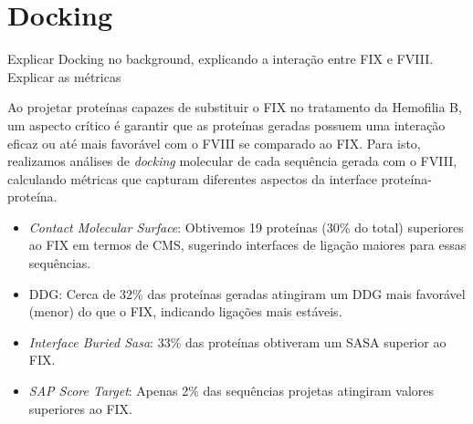 \section{Docking}

{\color{red} Explicar Docking no background, explicando a interação entre FIX e FVIII. Explicar as métricas}        

Ao projetar proteínas capazes de substituir o FIX no tratamento da Hemofilia B, um aspecto crítico é garantir que as 
proteínas geradas possuem uma interação eficaz ou até mais favorável com o FVIII se comparado ao FIX.
Para isto, realizamos análises de \textit{docking} molecular de cada sequência gerada com o FVIII,
calculando métricas que capturam diferentes aspectos da interface proteína-proteína. 

\begin{itemize}
    \item \textit{Contact Molecular Surface}: Obtivemos 19 proteínas (30\% do total) superiores ao FIX em termos de CMS, 
    sugerindo interfaces de ligação maiores para essas sequências.
    \item DDG: Cerca de 32\% das proteínas geradas atingiram um DDG mais favorável (menor) do que o FIX, indicando ligações mais estáveis.   
    \item \textit{Interface Buried Sasa}: 33\% das proteínas obtiveram um SASA superior ao FIX.
    \item \textit{SAP Score Target}: Apenas 2\% das sequências projetas atingiram valores superiores ao FIX.
  \end{itemize}


